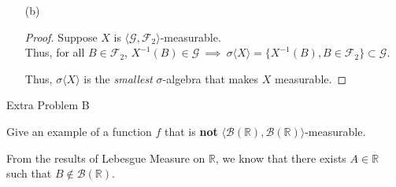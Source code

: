 \documentclass[12pt,letterpaper, onecolumn]{exam}
\newcommand{\real}{\mathbb{R}}
\newcommand{\salg}{$\sigma$-algebra }
\newcommand{\calF}{\mathcal{F}}
\newcommand{\calG}{\mathcal{G}}
\newcommand{\gensig}[1]{\sigma\langle #1 \rangle} %
\newcommand{\tribrac}[1]{\langle #1 \rangle}
\newcommand{\borel}{\mathcal{B}(\mathbb{R})}
\newcommand{\Iunion}{\bigcup_{\alpha \in I}}
\begin{document}
\begin{questions}
\begin{solution}
\begin{itemize}
\begin{proof}
                \textbf{Part 2:} WTS: $A \in \gensig{X} \: \implies \: A^c 
                \in \gensig{X}$

                Let $A \in \gensig{X}$ be given. \\ 
                Thus, there exists some $B \in \calF_2$ such that $A = X^{-1}(B)$. \\
                $A^c = (X^{-1}(B))^c = X^{-1}(B^c)$, by Problem 2.1. \\
                $B^c \in \calF_2$ since $\calF_2$ is a \salg. \\
                Thus, $A = X^{-1}(B^c) \in \gensig{X}$

                \textbf{Part 3:} WTS $A_1, A_2, ..., A_n \in \gensig{X} \: \implies \Iunion A_\alpha \in \gensig{X}$, where $I = (1, 2, ... , n)$ for some fixed n

                Let $A_1, A_2, ..., A_n \in \gensig{X}$ be given. Thus there exists $B_i \in \calF_2$ such that $A_\alpha = X^{-1}(B_\alpha)$ for all $\alpha \in I$. \\
                $\Iunion A_\alpha = \Iunion X^{-1}(B_\alpha) = X^{-1}\left(\Iunion B_\alpha\right)$, by Problem 2.1\\
                $\Iunion B_\alpha \in \calF_2$ since $\calF_2$ is a \salg. \\
                Thus, $\Iunion A_\alpha = X^{-1}\left(\Iunion B_\alpha\right) \in \gensig{X}$. 

                Thus, $\gensig{X}$ is a \salg.
            \end{proof}
            \item[(b)] 
            \begin{proof}
                Suppose $X$ is $\tribrac{\calG, \calF_2} $-measurable. \\
                Thus, for all $B \in \calF_2$, $X^{-1}(B) \in \calG \: \implies \: \gensig{X} = \{X^{-1}(B), B \in \calF_2\} \subset \calG$.

                Thus, $\gensig{X}$ is the \textit{smallest} \salg that makes $X$ measurable.
            \end{proof}
        \end{itemize}
    \end{solution}

    \question Extra Problem B

    Give an example of a function $f$ that is \textbf{not} $\tribrac{\borel, \borel}$-measurable.
    \begin{solution}
    From the results of Lebesgue Measure on $\real$, we know that there exists $A \in \real$ such that $B \notin \borel$.


\end{solution}
\end{questions}
\end{document}
